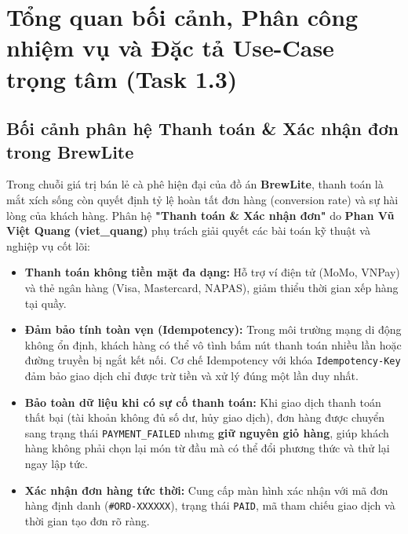 \documentclass[a4paper]{article}
\begin{document}
\thispagestyle{empty}
\newpage
\tableofcontents
\newpage

\section{Tổng quan bối cảnh, Phân công nhiệm vụ và Đặc tả Use-Case trọng tâm (Task 1.3)}

\subsection{Bối cảnh phân hệ Thanh toán \& Xác nhận đơn trong BrewLite}
Trong chuỗi giá trị bán lẻ cà phê hiện đại của đồ án \textbf{BrewLite}, thanh toán là mắt xích sống còn quyết định tỷ lệ hoàn tất đơn hàng (conversion rate) và sự hài lòng của khách hàng. Phân hệ \textbf{"Thanh toán \& Xác nhận đơn"} do \textbf{Phan Vũ Việt Quang (viet\_quang)} phụ trách giải quyết các bài toán kỹ thuật và nghiệp vụ cốt lõi:
\begin{itemize}
    \item \textbf{Thanh toán không tiền mặt đa dạng:} Hỗ trợ ví điện tử (MoMo, VNPay) và thẻ ngân hàng (Visa, Mastercard, NAPAS), giảm thiểu thời gian xếp hàng tại quầy.
    \item \textbf{Đảm bảo tính toàn vẹn (Idempotency):} Trong môi trường mạng di động không ổn định, khách hàng có thể vô tình bấm nút thanh toán nhiều lần hoặc đường truyền bị ngắt kết nối. Cơ chế Idempotency với khóa \texttt{Idempotency-Key} đảm bảo giao dịch chỉ được trừ tiền và xử lý đúng một lần duy nhất.
    \item \textbf{Bảo toàn dữ liệu khi có sự cố thanh toán:} Khi giao dịch thanh toán thất bại (tài khoản không đủ số dư, hủy giao dịch), đơn hàng được chuyển sang trạng thái \texttt{PAYMENT\_FAILED} nhưng \textbf{giữ nguyên giỏ hàng}, giúp khách hàng không phải chọn lại món từ đầu mà có thể đổi phương thức và thử lại ngay lập tức.
    \item \textbf{Xác nhận đơn hàng tức thời:} Cung cấp màn hình xác nhận với mã đơn hàng định danh (\texttt{\#ORD-XXXXXX}), trạng thái \texttt{PAID}, mã tham chiếu giao dịch và thời gian tạo đơn rõ ràng.
\end{itemize}
\end{document}
